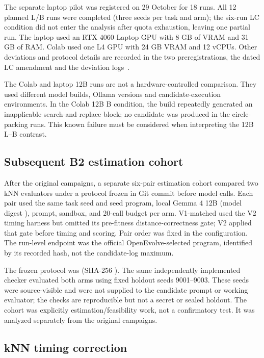 \documentclass[11pt]{article}
\begin{document}
The separate laptop pilot was registered on 29 October for 18 runs. All 12 planned L/B runs were completed (three seeds per task and arm); the six-run LC condition did not enter the analysis after quota exhaustion, leaving one partial run. The laptop used an RTX 4060 Laptop GPU with 8 GB of VRAM and 31 GB of RAM. Colab used one L4 GPU with 24 GB VRAM and 12 vCPUs. Other deviations and protocol details are recorded in the two preregistrations, the dated LC amendment and the deviation logs~\citep{pylypenko2026artifacts}.

The Colab and laptop 12B runs are not a hardware-controlled comparison. They used different model builds, Ollama versions and candidate-execution environments. In the Colab 12B B condition, the build repeatedly generated an inapplicable search-and-replace block; no candidate was produced in the circle-packing runs. This known failure must be considered when interpreting the 12B L--B contrast.

\subsection{Subsequent B2 estimation cohort}

After the original campaigns, a separate six-pair estimation cohort compared two kNN evaluators under a protocol frozen in Git commit  before model calls. Each pair used the same task seed and seed program, local Gemma 4 12B (model digest ), prompt, sandbox, and 20-call budget per arm. V1-matched used the V2 timing harness but omitted its pre-fitness distance-correctness gate; V2 applied that gate before timing and scoring. Pair order was fixed in the configuration. The run-level endpoint was the official OpenEvolve-selected program, identified by its recorded hash, not the candidate-log maximum.

The frozen protocol was  (SHA-256 ). The same independently implemented checker evaluated both arms using fixed holdout seeds 9001--9003. These seeds were source-visible and were not supplied to the candidate prompt or working evaluator; the checks are reproducible but not a secret or sealed holdout. The cohort was explicitly estimation/feasibility work, not a confirmatory test. It was analyzed separately from the original campaigns.

\subsection{kNN timing correction}
\end{document}
